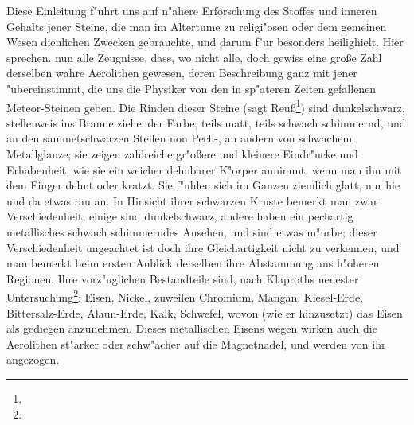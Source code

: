 \documentclass[a4paper, 11pt, oneside, polutonikogreek, german]{article}
\begin{document}
Diese Einleitung f"uhrt uns auf n"ahere Erforschung des Stoffes und inneren Gehalts jener Steine, die man im Altertume zu religi"osen oder dem gemeinen Wesen dienlichen Zwecken gebrauchte, und darum f"ur besonders heilighielt. Hier sprechen. nun alle Zeugnisse, dass, wo nicht alle, doch gewiss eine große Zahl derselben wahre Aerolithen gewesen, deren Beschreibung ganz mit jener "ubereinstimmt, die uns die Physiker von den in sp"ateren Zeiten gefallenen Meteor-Steinen geben. Die Rinden dieser Steine (sagt Reuß\footnote{}) sind dunkelschwarz, stellenweis ins Braune ziehender Farbe, teils matt, teils schwach schimmernd, und an den sammetschwarzen Stellen non Pech-, an andern von schwachem Metallglanze; sie zeigen zahlreiche gr"oßere und kleinere Eindr"ucke und Erhabenheit, wie sie ein weicher dehnbarer K"orper annimmt, wenn man ihn mit dem Finger dehnt oder kratzt. Sie f"uhlen sich im Ganzen ziemlich glatt, nur hie und da etwas rau an. In Hinsicht ihrer schwarzen Kruste bemerkt man zwar Verschiedenheit, einige sind dunkelschwarz, andere haben ein pechartig metallisches schwach schimmerndes Ansehen, und sind etwas m"urbe; dieser Verschiedenheit ungeachtet ist doch ihre Gleichartigkeit nicht zu verkennen, und man bemerkt beim ersten Anblick derselben ihre Abstammung aus h"oheren Regionen. Ihre vorz"uglichen Bestandteile sind, nach Klaproths neuester Untersuchung\footnote{}: Eisen, Nickel, zuweilen Chromium, Mangan, Kiesel-Erde, Bittersalz-Erde, Alaun-Erde, Kalk, Schwefel, wovon (wie er hinzusetzt) das Eisen als gediegen anzunehmen. Dieses metallischen Eisens wegen wirken auch die Aerolithen st"arker oder schw"acher auf die Magnetnadel, und werden von ihr angezogen.
\end{document}
